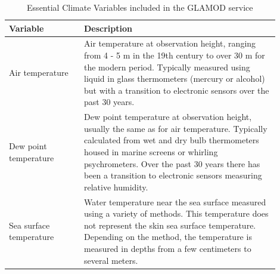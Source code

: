 \begin{table}[h]
\centering
\caption{Essential Climate Variables included in the GLAMOD service}
\label{tab:ecvs}
\begin{tabular}{|p{0.25\linewidth}|p{0.65\linewidth}|}
\hline
\bfseries Variable & \bfseries Description \\ 
\hline
Air temperature & Air temperature at observation height, ranging from 4 - 5 m in the 19th century to over 30 m for the modern period. Typically measured using liquid in glass thermometers (mercury or alcohol) but with a transition to electronic sensors over the past 30 years.\\
\hline
Dew point temperature & Dew point temperature at observation height, usually the same as for air temperature. Typically calculated from wet and dry bulb thermometers housed in marine screens or whirling psychrometers. Over the past 30 years there has been a transition to electronic sensors measuring relative humidity.\\
\hline
Sea surface temperature & Water temperature near the sea surface measured using a variety of methods.
This temperature does not represent the skin sea surface temperature. Depending on the method, the temperature is measured in depths from a few centimeters to several meters.

\end{tabular}
\end{table}
